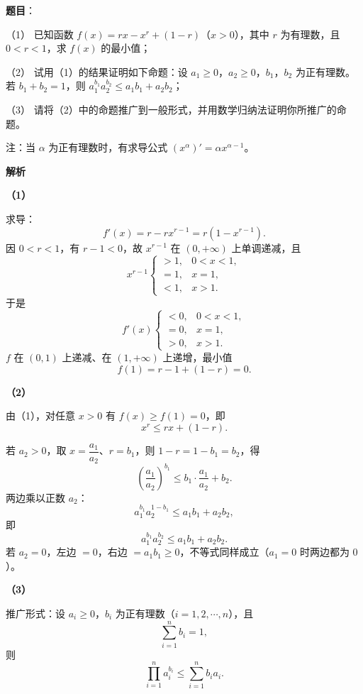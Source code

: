 \begin{answer}

\textbf{题目}：

（1） 已知函数 $f(x)=rx-x^r+(1-r)$（$x>0$），其中 $r$ 为有理数，且 $0<r<1$，求 $f(x)$ 的最小值；

（2） 试用（1）的结果证明如下命题：设 $a_1\geqslant0$，$a_2\geqslant0$，$b_1$，$b_2$ 为正有理数。若 $b_1+b_2=1$，则 $a_1^{b_1}a_2^{b_2}\leqslant a_1b_1+a_2b_2$；

（3） 请将（2）中的命题推广到一般形式，并用数学归纳法证明你所推广的命题。

注：当 $\alpha$ 为正有理数时，有求导公式 $(x^\alpha)'=\alpha x^{\alpha-1}$。

\textbf{解析}

\textbf{（1）}

求导：
\nopagebreak[4]
\[f'(x)=r-rx^{r-1}=r\left(1-x^{r-1}\right).\]
因 $0<r<1$，有 $r-1<0$，故 $x^{r-1}$ 在 $(0,+\infty)$ 上单调递减，且
\nopagebreak[4]
\[x^{r-1}\begin{cases}>1,&0<x<1,\\=1,&x=1,\\<1,&x>1.\end{cases}\]
于是
\nopagebreak[4]
\[f'(x)\begin{cases}<0,&0<x<1,\\=0,&x=1,\\>0,&x>1.\end{cases}\]
$f$ 在 $(0,1)$ 上递减、在 $(1,+\infty)$ 上递增，最小值
\nopagebreak[4]
\[f(1)=r-1+(1-r)=0.\]

\textbf{（2）}

由（1），对任意 $x>0$ 有 $f(x)\geqslant f(1)=0$，即
\nopagebreak[4]
\[x^r\leqslant rx+(1-r).\]

若 $a_2>0$，取 $x=\dfrac{a_1}{a_2}$、$r=b_1$，则 $1-r=1-b_1=b_2$，得
\nopagebreak[4]
\[\left(\frac{a_1}{a_2}\right)^{b_1}\leqslant b_1\cdot\frac{a_1}{a_2}+b_2.\]
两边乘以正数 $a_2$：
\nopagebreak[4]
\[a_1^{b_1}a_2^{1-b_1}\leqslant a_1b_1+a_2b_2,\]
即
\nopagebreak[4]
\[a_1^{b_1}a_2^{b_2}\leqslant a_1b_1+a_2b_2.\]
若 $a_2=0$，左边 $=0$，右边 $=a_1b_1\geqslant0$，不等式同样成立（$a_1=0$ 时两边都为 $0$）。

\textbf{（3）}

推广形式：设 $a_i\geqslant0$，$b_i$ 为正有理数（$i=1,2,\cdots,n$），且
\nopagebreak[4]
\[\sum_{i=1}^{n}b_i=1,\]
则
\nopagebreak[4]
\[\prod_{i=1}^{n}a_i^{b_i}\leqslant\sum_{i=1}^{n}b_ia_i.\]


\end{answer}
